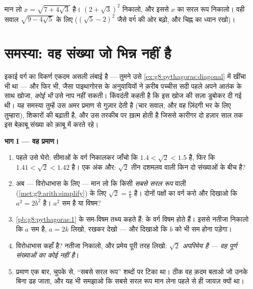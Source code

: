 \begin{exercise}[$\star\star\star$]\label{exo:g9:sqrt:10}
मान लो $x = \sqrt{7 + 4\sqrt3}$ है। $\left(2 + \sqrt3\right)^2$
निकालो, और इससे $x$ का सरल रूप निकालो। वही सवाल
$\sqrt{9 - 4\sqrt5}$ के लिए ($\left(\sqrt5 - 2\right)^2$ जैसे वर्ग
की ओर बढ़ो, और चिह्न का ध्यान रखो)।
\end{exercise}

\section{समस्या: वह संख्या जो भिन्न नहीं है}

\begin{problem}
\label{pb:g9:sqrt:1}
इकाई वर्ग का विकर्ण एकदम असली लंबाई है --- तुमने उसे
\cref{ex:g8:pythagoras:diagonal} में खींचा भी था --- और फिर भी, जैसा
पाइथागोरस के अनुयायियों ने क़रीब पच्चीस सदी पहले अपने आतंक के साथ
खोजा, \emph{कोई भी } उसे नाप नहीं सकती। किंवदंती कहती है कि इस
खोज की सज़ा डुबोकर दी गई थी। यह समस्या तुम्हें उस अमर प्रमाण से गुज़ार
देती है (चार सवाल, और वह ज़िंदगी भर के लिए तुम्हारा), शिकारों की
 बढ़ाती है, और उस तरकीब पर ख़त्म होती है जिससे कारीगर दो हज़ार साल
तक इस बेक़ाबू संख्या को क़ाबू में करते रहे।

\medskip
\noindent\textbf{भाग I --- वह प्रमाण।}
\begin{enumerate}
  \item पहले उसे घेरो: सीमाओं के वर्ग निकालकर जाँचो कि
        $1.4 < \sqrt2 < 1.5$ है, फिर कि $1.41 < \sqrt2 < 1.42$ है।
        एक अंक और: $\sqrt2$ तीन दशमलव वाली किन दो संख्याओं के बीच
        है?
  \item अब --- विरोधाभास के लिए --- मान लो कि किसी \emph{सबसे सरल
        रूप} वाली  (\cref{met:g9:arith:simplify}) के लिए
        $\sqrt2 = \frac ab$ है। दोनों पक्षों का वर्ग करो और दिखाओ
        कि $a^2 = 2 b^2$ है। $a^2$ सम है या विषम?
  \item \cref{pb:g8:pythagoras:1} के सम-विषम तथ्य कहते हैं:  के वर्ग विषम होते हैं। इससे नतीजा निकालो कि $a$ सम
        है, $a = 2k$ लिखो, रखकर देखो --- और दिखाओ कि $b$ को भी सम
        होना पड़ेगा।
  \item विरोधाभास कहाँ है? नतीजा निकालो, और प्रमेय पूरी तरह लिखो:
        \emph{$\sqrt2$ अपरिमेय है --- वह पूर्ण संख्याओं का कोई
         नहीं है}।
  \item प्रमाण एक बार, चुपके से, ``सबसे सरल रूप'' शब्दों पर टिका
        था। ठीक वह क़दम बताओ जो उनके बिना ढह जाता, और यह भी समझाओ
        कि सबसे सरल रूप मान लेना पहले से ही जायज़ क्यों था।
\end{enumerate}


\end{problem}
